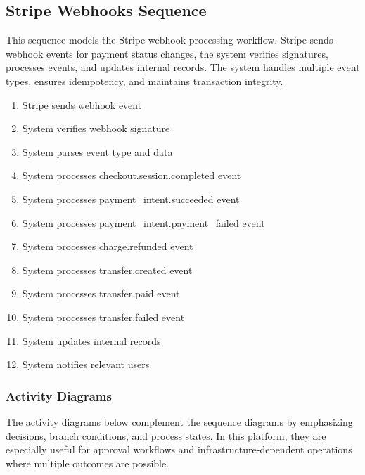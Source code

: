 
\subsection{Stripe Webhooks Sequence}
This sequence models the Stripe webhook processing workflow. Stripe sends
webhook events for payment status changes, the system verifies signatures,
processes events, and updates internal records. The system handles multiple
event types, ensures idempotency, and maintains transaction integrity.

\begin{enumerate}[topsep=0pt,itemsep=1pt,parsep=0pt,partopsep=0pt]
    \item Stripe sends webhook event
    \item System verifies webhook signature
    \item System parses event type and data
    \item System processes checkout.session.completed event
    \item System processes payment\_intent.succeeded event
    \item System processes payment\_intent.payment\_failed event
    \item System processes charge.refunded event
    \item System processes transfer.created event
    \item System processes transfer.paid event
    \item System processes transfer.failed event
    \item System updates internal records
    \item System notifies relevant users
\end{enumerate}

\iffalse
    \subsubsection*{Activity Diagrams}

    The activity diagrams below complement the sequence diagrams by emphasizing
    decisions, branch conditions, and process states. In this platform, they are
    especially useful for approval workflows and infrastructure-dependent
    operations where multiple outcomes are possible.

